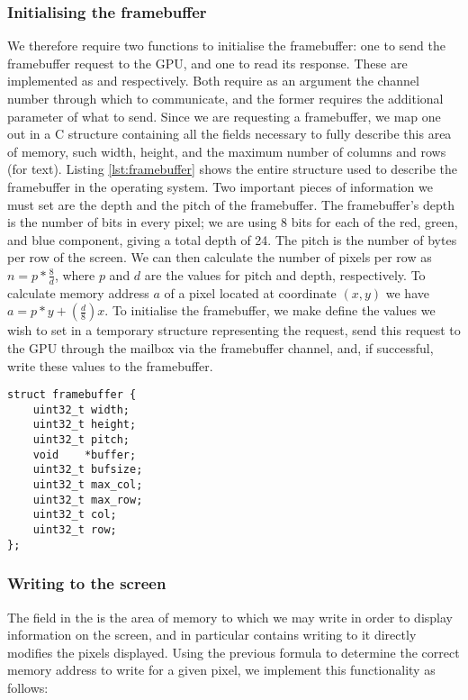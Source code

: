     \subsubsection{Initialising the framebuffer}
        We therefore require two functions to initialise the framebuffer: one to
        send the framebuffer request to the GPU, and one to read its response.
        These are implemented as  and
         respectively. Both require as an argument the
        channel number through which to communicate, and the former requires the
        additional parameter of what to send. Since we are requesting a
        framebuffer, we map one out in a C structure containing all the fields
        necessary to fully describe this area of memory, such width, height, and
        the maximum number of columns and rows (for text). Listing
        \ref{lst:framebuffer} shows the entire structure used to describe the
        framebuffer in the operating system. Two important pieces of information
        we must set are the depth and the pitch of the framebuffer. The
        framebuffer's depth is the number of bits in every pixel; we are using 8
        bits for each of the red, green, and blue component, giving a total
        depth of 24. The pitch is the number of bytes per row of the screen. We
        can then calculate the number of pixels per row as $n = p *
        \frac{8}{d}$, where $p$ and $d$ are the values for pitch and depth,
        respectively. To calculate memory address $a$ of a pixel located at
        coordinate $(x,y)$ we have $a = p * y + (\frac{d}{8}) x$. To initialise
        the framebuffer, we make define the values we wish to set in a temporary
        structure representing the request, send this request to the GPU through
        the mailbox via the framebuffer channel, and, if successful, write these
        values to the framebuffer.

        \lstset{language=c}
        \begin{lstlisting}[caption={Structure representing the
        framebuffer},captionpos=b,label={lst:framebuffer}]
struct framebuffer {
    uint32_t width;
    uint32_t height;
    uint32_t pitch;
    void    *buffer;
    uint32_t bufsize;
    uint32_t max_col;
    uint32_t max_row;
    uint32_t col;
    uint32_t row;
};
        \end{lstlisting}

    \subsubsection{Writing to the screen}
        The field  in the  is the area of
        memory to which we may write in order to display information on the
        screen, and in particular contains writing to it directly modifies the
        pixels displayed. Using the previous formula to determine the correct
        memory address to write for a given pixel, we implement this
        functionality as follows:

